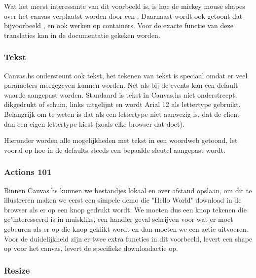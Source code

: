 

Wat het meest interessante van dit voorbeeld is, is hoe de mickey mouse shapes over het canvas verplaatst worden door een . Daarnaast wordt ook getoont dat bijvoorbeeld ,  en  ook werken op containers. Voor de exacte functie van deze translaties kan in de documentatie gekeken worden. 

\subsubsection{Tekst}

Canvas.hs ondersteunt ook tekst, het tekenen van tekst is speciaal omdat er veel parameters meegegeven kunnen worden. Net als bij de events kan een default waarde aangepast worden. Standaard is tekst in Canvas.hs niet onderstreept, dikgedrukt of schuin, links uitgelijnt en wordt Arial 12 als lettertype gebruikt. Belangrijk om te weten is dat als een lettertype niet aanwezig is, dat de client dan een eigen lettertype kiest (zoals elke browser dat doet).

Hieronder worden alle mogelijkheden met tekst in een woordweb getoond, let vooral op hoe in de defaults steeds een bepaalde sleutel aangepast wordt.


\subsubsection{Actions 101}

Binnen Canvas.hs kunnen we bestandjes lokaal en over afstand opslaan, om dit te illustreren maken we eerst een simpele demo die "Hello World" download in de browser als er op een knop gedrukt wordt. We moeten dus een knop tekenen die ge"interesseerd is in muiskliks, een handler geval schrijven voor wat er moet gebeuren als er op die knop geklikt wordt en dan moeten we een  actie uitvoeren. Voor de duidelijkheid zijn er twee extra functies in dit voorbeeld,  levert een shape op voor het canvas,  levert de specifieke downloadactie op.



\subsubsection{Resize}

